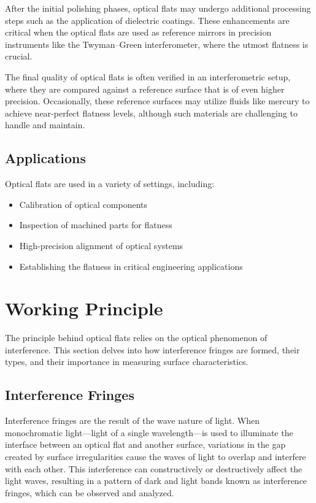 \documentclass[../main.tex]{subfiles}
\begin{document}
After the initial polishing phases, optical flats may undergo additional processing steps such as the application of dielectric coatings. These enhancements are critical when the optical flats are used as reference mirrors in precision instruments like the Twyman–Green interferometer, where the utmost flatness is crucial.\cite{Paschottaoptical_flats}

The final quality of optical flats is often verified in an interferometric setup, where they are compared against a reference surface that is of even higher precision. Occasionally, these reference surfaces may utilize fluids like mercury to achieve near-perfect flatness levels, although such materials are challenging to handle and maintain.\cite{Paschottaoptical_flats}

\subsection{Applications}
Optical flats are used in a variety of settings, including:
\begin{itemize}
    \item Calibration of optical components
    \item Inspection of machined parts for flatness
    \item High-precision alignment of optical systems
    \item Establishing the flatness in critical engineering applications
\end{itemize}

\section{Working Principle}
The principle behind optical flats relies on the optical phenomenon of interference. This section delves into how interference fringes are formed, their types, and their importance in measuring surface characteristics.

\subsection{Interference Fringes}
Interference fringes are the result of the wave nature of light. When monochromatic light—light of a single wavelength—is used to illuminate the interface between an optical flat and another surface, variations in the gap created by surface irregularities cause the waves of light to overlap and interfere with each other. This interference can constructively or destructively affect the light waves, resulting in a pattern of dark and light bands known as interference fringes, which can be observed and analyzed.
\end{document}
